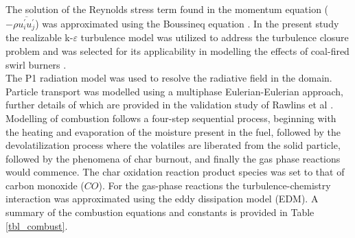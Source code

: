\documentclass[a4paper,fleqn]{cas-sc}
\begin{document}
The solution of the Reynolds stress term found in the momentum equation ($-\rho\overline{u_{i}^{'}u_{j}^{'}}$) was approximated using the Boussineq equation \citep{Versteeg2007}. In the present study the realizable k-$\varepsilon$ turbulence model was utilized to address the turbulence closure problem and was selected for its applicability in modelling the effects of coal-fired swirl burners \citep{Modlinski2010}.\\

The P1 radiation model was used to resolve the radiative field in the domain. Particle transport was modelled using a multiphase Eulerian-Eulerian approach, further details of which are provided in the validation study of Rawlins et al \citep{Rawlins2021, Rawlins2022}. Modelling of combustion follows a four-step sequential process, beginning with the heating and evaporation of the moisture present in the fuel, followed by the devolatilization process where the volatiles are liberated from the solid particle, followed by the phenomena of char burnout, and finally the gas phase reactions would commence. The char oxidation reaction product species was set to that of carbon monoxide ($CO$). For the gas-phase reactions the turbulence-chemistry interaction was approximated using the eddy dissipation model (EDM). A summary of the combustion equations and constants is provided in Table \ref{tbl_combust}.\\
\end{document}
